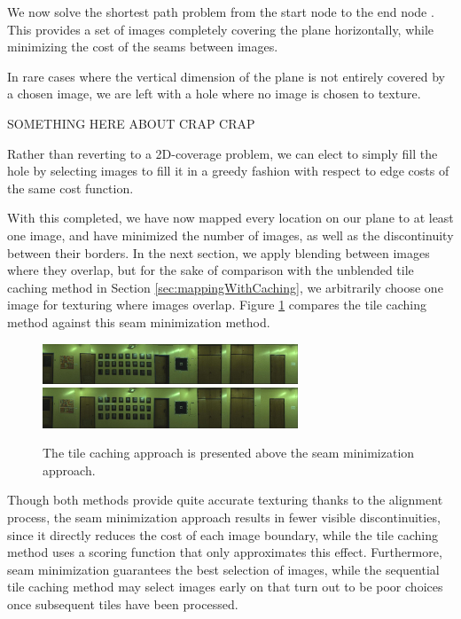 \documentclass[10pt,twocolumn,letterpaper]{article}
\begin{document}
We now solve the shortest path problem from the start node to
the end node \cite{dijkstra}. This provides a set of images
completely covering the plane horizontally, while minimizing the cost
of the seams between images.

In rare cases where the vertical dimension of the plane is not
entirely covered by a chosen image, we are left with a hole where no
image is chosen to texture.

SOMETHING HERE ABOUT CRAP CRAP

Rather than reverting to a 2D-coverage problem, we can elect to simply
fill the hole by selecting images to fill it in a greedy fashion with
respect to edge costs of the same cost function.

With this completed, we have now mapped every location on our plane to
at least one image, and have minimized the number of images, as well
as the discontinuity between their borders. In the next section, we
apply blending between images where they overlap, but for the sake of
comparison with the unblended tile caching method in Section
\ref{sec:mappingWithCaching}, we arbitrarily choose one image for
texturing where images overlap. Figure \ref{fig:compare_unblended}
compares the tile caching method against this seam minimization
method.

\begin{figure}
  \centering
  \includegraphics[width=3in]{wall1_cache_full_shifted.jpg}
  \includegraphics[width=3in]{wall1_dynprog_noblend.jpg}
  \caption{The tile caching approach is presented above the seam
    minimization approach.}
  \label{fig:compare_unblended}
\end{figure}


Though both methods provide quite accurate texturing thanks to the
alignment process, the seam minimization approach results in fewer
visible discontinuities, since it directly reduces the cost of each
image boundary, while the tile caching method uses a scoring function
that only approximates this effect. Furthermore, seam minimization
guarantees the best selection of images, while the sequential tile
caching method may select images early on that turn out to be poor
choices once subsequent tiles have been processed.
\end{document}

